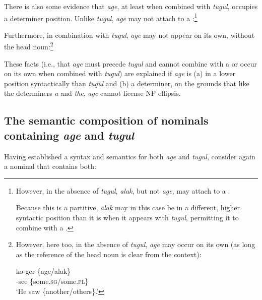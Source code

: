 \documentclass[output=paper]{LSP/langsci}
\begin{document}
There is also some evidence that \textit{age}, at least when combined with \textit{tugul}, occupies a determiner position. Unlike \textit{tugul}, \textit{age} may not attach to a :\footnote{However, in the absence of \textit{tugul}, \textit{alak}, but not \textit{age}, may attach to a :

\z 

 \noindent Because this is a partitive, \textit{alak} may in this case be in a different, higher syntactic position than it is when it appears with \textit{tugul}, permitting it to combine with a .}

\z

 Furthermore, in combination with \textit{tugul}, \textit{age} may not appear on its own, without the head noun:\footnote{However, here too, in the absence of \textit{tugul}, \textit{age} may occur on its own (as long as the reference of the head noun is clear from the context):

\ea\label{ex:agetugulonown}
    \gll ko-ger \{age/alak\}\\ 
	     \pst-see \{some.\textsc{sg}/some.\textsc{pl}\} \\
     \glt ‘He saw \{another/others\}.’   
     \z }

\z 

These facts (i.e., that \textit{age} must precede \textit{tugul} and cannot combine with a  or occur on its own when combined with \textit{tugul}) are explained if \textit{age} is (a) in a lower position syntactically than \textit{tugul} and (b) a determiner, on the grounds that like the  determiners \textit{a} and \textit{the}, \textit{age} cannot license NP ellipsis.

\subsection{The semantic composition of nominals containing \textit{age} and \textit{tugul}}
Having established a syntax and semantics for both \textit{age} and \textit{tugul}, consider again a nominal that contains both:
\end{document}
